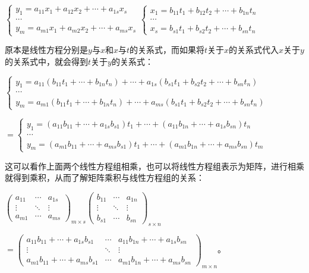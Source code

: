 \documentclass[UTF8, 12pt]{ctexart}
\begin{document}
$\begin{cases}
y_1=a_{11}x_1+a_{12}x_2+\cdots+a_{1s}x_s \\
\cdots \\
y_m=a_{m1}x_1+a_{m2}x_2+\cdots+a_{ms}x_s
\end{cases}\begin{cases}
x_1=b_{11}t_1+b_{12}t_2+\cdots+b_{1n}t_n \\
\cdots \\
x_s=b_{s1}t_1+b_{s2}t_2+\cdots+b_{sn}t_n
\end{cases}$\medskip

原本是线性方程分别是$y$与$x$和$x$与$t$的关系式，而如果将$t$关于$x$的关系式代入$x$关于$y$的关系式中，就会得到$t$关于$y$的关系式：\medskip

$\begin{cases}
y_1=a_{11}(b_{11}t_1+\cdots+b_{1n}t_n)+\cdots+a_{1s}(b_{s1}t_1+b_{s2}t_2+\cdots+b_{sn}t_n) \\
\cdots \\
y_m=a_{m1}(b_{11}t_1+\cdots+b_{1n}t_n)+\cdots+a_{ms}(b_{s1}t_1+b_{s2}t_2+\cdots+b_{sn}t_n)
\end{cases}$

$=\begin{cases}
y_1=(a_{11}b_{11}+\cdots+a_{1s}b_{s1})t_1+\cdots+(a_{11}b_{1n}+\cdots+a_{1s}b_{sn})t_n \\
\cdots \\
y_m=(a_{m1}b_{11}+\cdots+a_{ms}b_{s1})t_1+\cdots+(a_{m1}b_{1n}+\cdots+a_{ms}b_{sn})t_m
\end{cases}$ \medskip

这可以看作上面两个线性方程组相乘，也可以将线性方程组表示为矩阵，进行相乘就得到乘积，从而了解矩阵乘积与线性方程组的关系：\medskip


$\left(\begin{array}{ccc}
a_{11} & \cdots & a_{1s} \\
\vdots & \ddots & \vdots \\
a_{m1} & \cdots & a_{ms}
\end{array}\right)_{m\times s}\left(\begin{array}{ccc}
b_{11} & \cdots & a_{1n} \\
\vdots & \ddots & \vdots \\
b_{s1} & \cdots & b_{sn}
\end{array}\right)_{s\times n}$

$=\left(\begin{array}{ccc}
a_{11}b_{11}+\cdots+a_{1s}b_{s1} & \cdots & a_{11}b_{1n}+\cdots+a_{1s}b_{sn} \\
\vdots & \ddots & \vdots \\
a_{m1}b_{11}+\cdots+a_{ms}b_{s1} & \cdots & a_{m1}b_{1n}+\cdots+a_{ms}b_{sn}
\end{array}\right)_{m\times n}\text{。}$
\end{document}
